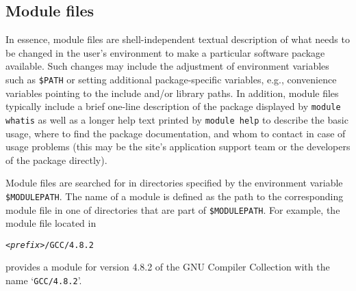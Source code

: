 %
%

\subsection{Module files}
\label{sec:Module_files}

In essence, module files are shell-independent textual description of
what needs to be changed in the user's environment to make a
particular software package available. Such changes may include the
adjustment of environment variables such as \texttt{\$PATH} or setting
additional package-specific variables, e.g., convenience
variables pointing to the include and/or library paths.  In addition,
module files typically include a brief one-line description of the
package displayed by \texttt{module whatis} as well as a longer help
text printed by \texttt{module help} to describe the basic usage,
where to find the package documentation, and whom to contact in case
of usage problems (this may be the site's application support team or
the developers of the package directly).

Module files are searched for in directories specified by the
environment variable \texttt{\$MODULEPATH}. The name of a module is defined
as the path to the corresponding module file in one of directories that are
part of \texttt{\$MODULEPATH}. For example, the module file located in
{\small
\begin{alltt}
    <\emph{prefix}>/GCC/4.8.2
\end{alltt}
}
provides a module for version 4.8.2 of the GNU Compiler Collection with the
name `\texttt{GCC/4.8.2}'.

